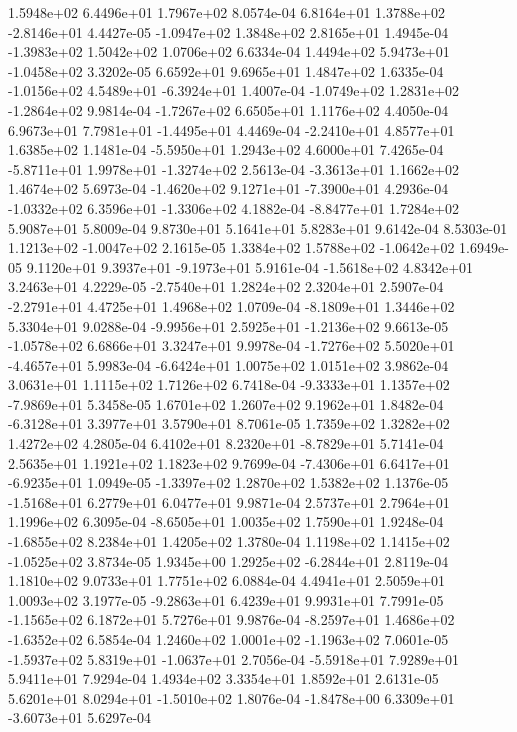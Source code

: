 1.5948e+02 6.4496e+01 1.7967e+02  8.0574e-04
 6.8164e+01  1.3788e+02 -2.8146e+01  4.4427e-05
-1.0947e+02  1.3848e+02  2.8165e+01  1.4945e-04
-1.3983e+02  1.5042e+02  1.0706e+02  6.6334e-04
 1.4494e+02  5.9473e+01 -1.0458e+02  3.3202e-05
6.6592e+01 9.6965e+01 1.4847e+02  1.6335e-04
-1.0156e+02  4.5489e+01 -6.3924e+01  1.4007e-04
-1.0749e+02  1.2831e+02 -1.2864e+02  9.9814e-04
-1.7267e+02  6.6505e+01  1.1176e+02  4.4050e-04
 6.9673e+01  7.7981e+01 -1.4495e+01  4.4469e-04
-2.2410e+01  4.8577e+01  1.6385e+02  1.1481e-04
-5.5950e+01  1.2943e+02  4.6000e+01  7.4265e-04
-5.8711e+01  1.9978e+01 -1.3274e+02  2.5613e-04
-3.3613e+01  1.1662e+02  1.4674e+02  5.6973e-04
-1.4620e+02  9.1271e+01 -7.3900e+01  4.2936e-04
-1.0332e+02  6.3596e+01 -1.3306e+02  4.1882e-04
-8.8477e+01  1.7284e+02  5.9087e+01  5.8009e-04
9.8730e+01 5.1641e+01 5.8283e+01  9.6142e-04
 8.5303e-01  1.1213e+02 -1.0047e+02  2.1615e-05
 1.3384e+02  1.5788e+02 -1.0642e+02  1.6949e-05
 9.1120e+01  9.3937e+01 -9.1973e+01  5.9161e-04
-1.5618e+02  4.8342e+01  3.2463e+01  4.2229e-05
-2.7540e+01  1.2824e+02  2.3204e+01  2.5907e-04
-2.2791e+01  4.4725e+01  1.4968e+02  1.0709e-04
-8.1809e+01  1.3446e+02  5.3304e+01  9.0288e-04
-9.9956e+01  2.5925e+01 -1.2136e+02  9.6613e-05
-1.0578e+02  6.6866e+01  3.3247e+01  9.9978e-04
-1.7276e+02  5.5020e+01 -4.4657e+01  5.9983e-04
-6.6424e+01  1.0075e+02  1.0151e+02  3.9862e-04
3.0631e+01 1.1115e+02 1.7126e+02  6.7418e-04
-9.3333e+01  1.1357e+02 -7.9869e+01  5.3458e-05
1.6701e+02 1.2607e+02 9.1962e+01  1.8482e-04
-6.3128e+01  3.3977e+01  3.5790e+01  8.7061e-05
1.7359e+02 1.3282e+02 1.4272e+02  4.2805e-04
 6.4102e+01  8.2320e+01 -8.7829e+01  5.7141e-04
2.5635e+01 1.1921e+02 1.1823e+02  9.7699e-04
-7.4306e+01  6.6417e+01 -6.9235e+01  1.0949e-05
-1.3397e+02  1.2870e+02  1.5382e+02  1.1376e-05
-1.5168e+01  6.2779e+01  6.0477e+01  9.9871e-04
2.5737e+01 2.7964e+01 1.1996e+02  6.3095e-04
-8.6505e+01  1.0035e+02  1.7590e+01  1.9248e-04
-1.6855e+02  8.2384e+01  1.4205e+02  1.3780e-04
 1.1198e+02  1.1415e+02 -1.0525e+02  3.8734e-05
 1.9345e+00  1.2925e+02 -6.2844e+01  2.8119e-04
1.1810e+02 9.0733e+01 1.7751e+02  6.0884e-04
4.4941e+01 2.5059e+01 1.0093e+02  3.1977e-05
-9.2863e+01  6.4239e+01  9.9931e+01  7.7991e-05
-1.1565e+02  6.1872e+01  5.7276e+01  9.9876e-04
-8.2597e+01  1.4686e+02 -1.6352e+02  6.5854e-04
 1.2460e+02  1.0001e+02 -1.1963e+02  7.0601e-05
-1.5937e+02  5.8319e+01 -1.0637e+01  2.7056e-04
-5.5918e+01  7.9289e+01  5.9411e+01  7.9294e-04
1.4934e+02 3.3354e+01 1.8592e+01  2.6131e-05
 5.6201e+01  8.0294e+01 -1.5010e+02  1.8076e-04
-1.8478e+00  6.3309e+01 -3.6073e+01  5.6297e-04
